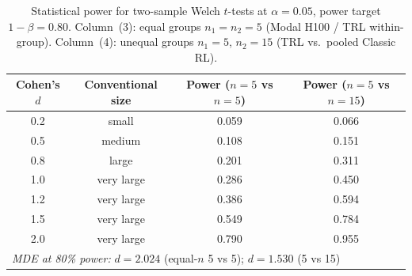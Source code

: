 \documentclass{article}
\begin{document}
\begin{table}[!ht]
\centering
\caption{Statistical power for two-sample Welch $t$-tests at $\alpha = 0.05$,
         power target $1{-}\beta = 0.80$.
         Column~(3): equal groups $n_1 = n_2 = 5$ (Modal H100 / TRL within-group).
         Column~(4): unequal groups $n_1 = 5$, $n_2 = 15$ (TRL vs.\ pooled Classic RL).}
\label{tab:power-analysis}
\small
\begin{tabular}{@{}cccc@{}}
\toprule
Cohen's $d$ & Conventional size & Power ($n{=}5$ vs $n{=}5$) & Power ($n{=}5$ vs $n{=}15$) \\
\midrule
        0.2 & small & 0.059 & 0.066 \\
        0.5 & medium & 0.108 & 0.151 \\
        0.8 & large & 0.201 & 0.311 \\
        1.0 & very large & 0.286 & 0.450 \\
        1.2 & very large & 0.386 & 0.594 \\
        1.5 & very large & 0.549 & 0.784 \\
        2.0 & very large & 0.790 & 0.955 \\
\midrule
\multicolumn{4}{l}{\textit{MDE at 80\% power:} $d = 2.024$ (equal-$n$ 5 vs 5);\; $d = 1.530$ (5 vs 15)} \\
\bottomrule
\end{tabular}
\end{table}
\end{document}
